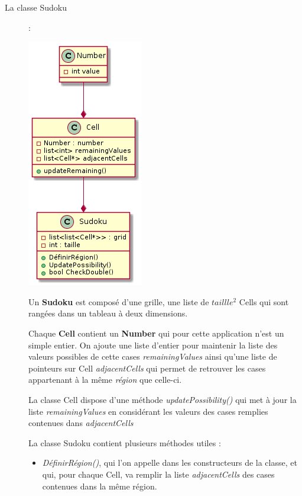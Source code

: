             \begin{description}
            	\item[La classe Sudoku] :
            
                \begin{center}
                    \includegraphics[scale = 0.5]{images/Sudoku_classe.png}	
                \end{center}
                \bigskip
                
                Un \textbf{Sudoku} est composé d'une grille, une liste de $taillle^2$ Cells qui sont rangées dans un tableau à deux dimensions. 
                
                Chaque \textbf{Cell} contient un \textbf{Number} qui pour cette application n'est un simple entier. On ajoute une liste d'entier pour maintenir la liste des valeurs possibles de cette cases \textit{remainingValues} ainsi qu'une liste de pointeurs sur Cell \textit{adjacentCells} qui permet de retrouver les cases appartenant à la même \textit{région} que celle-ci.
                
                La classe Cell dispose d'une méthode \textit{updatePossibility()} qui met à jour la liste \textit{remainingValues} en considérant les valeurs des cases remplies contenues dans \textit{adjacentCells}
                
                La classe Sudoku contient plusieurs méthodes utiles : 
                
\begin{itemize}
\item \textit{DéfinirRégion()}, qui l'on appelle dans les constructeurs de la classe, et qui, pour chaque Cell, va remplir la liste \textit{adjacentCells} des cases contenues dans la même région.


\end{itemize}
\end{description}
